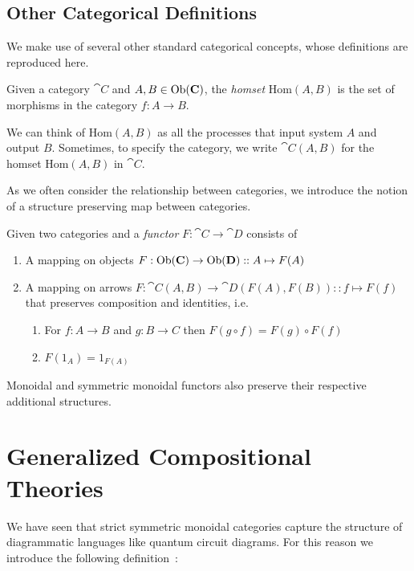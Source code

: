 \subsection{Other Categorical Definitions}

We make use of several other standard categorical concepts, whose definitions are reproduced here.

\begin{defn}
Given a category $\cat{C}$ and $A,B\in\mbox{Ob}(\mathbf{C})$, the \emph{homset} Hom$(A,B)$ is the set of morphisms in the category $f:A\to B$.
\end{defn}

We can think of Hom$(A,B)$ as all the processes that input system $A$ and output $B$. Sometimes, to specify the category, we write $\cat{C}(A,B)$ for the homset Hom$(A,B)$ in $\cat{C}$.

As we often consider the relationship between categories, we introduce the notion of a structure preserving map between categories.

\begin{defn}
Given two categories  and  a \emph{functor} $F:\cat{C}\to\cat{D}$ consists of
\begin{enumerate}
\item A mapping on objects $F:\mbox{Ob}(\mathbf{C})\to\mbox{Ob}(\mathbf{D})::A\mapsto F(A)$
\item A mapping on arrows $F:\cat{C}(A,B)\to\cat{D}(F(A),F(B))::f\mapsto F(f)$ that preserves composition and identities, i.e. 
\begin{enumerate}
\item For $f:A\to B$ and $g:B\to C$ then $F(g\circ f) = F(g)\circ F(f)$
\item $F(1_A)=1_{F(A)}$
\end{enumerate}
\end{enumerate}
\end{defn}

\noindent Monoidal and symmetric monoidal functors also preserve their respective additional structures.

\section{Generalized Compositional Theories}
\label{sec:GCTs}

We have seen that strict symmetric monoidal categories capture the structure of  diagrammatic languages like quantum circuit diagrams. For this reason we introduce the following definition~\cite{coecke2015generalised}:

